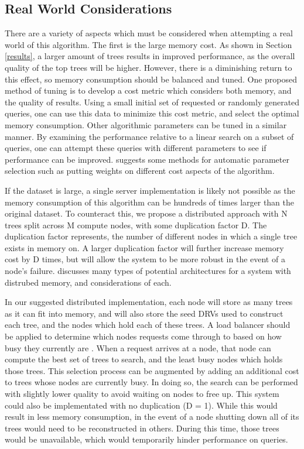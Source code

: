 \subsection{Real World Considerations}
\label{sec:realworld}

There are a variety of aspects which must be considered when attempting a real world of this algorithm.  The first is the large memory cost.  As shown in Section \ref{results}, a larger amount of trees results in improved performance, as the overall quality of the top trees will be higher.  However, there is a diminishing return to this effect, so memory consumption should be balanced and tuned.  One proposed method of tuning is to develop a cost metric which considers both memory, and the quality of results.  Using a small initial set of requested or randomly generated queries, one can use this data to minimize this cost metric, and select the optimal memory consumption.  Other algorithmic parameters can be tuned in a similar manner.  By examining the performance relative to a linear search on a subset of queries, one can attempt these queries with different parameters to see if performance can be improved.  \citep{muja_flann_2009} suggests some methods for automatic parameter selection such as putting weights on different cost aspects of the algorithm.

If the dataset is large, a single server implementation is likely not possible as the memory consumption of this algorithm can be hundreds of times larger than the original dataset.  To counteract this, we propose a distributed approach with N trees split across M compute nodes, with some duplication factor D.  The duplication factor represents, the number of different nodes in which a single tree exists in memory on.  A larger duplication factor will further increase memory cost by D times, but will allow the system to be more robust in the event of a node's failure.  \citep{nitzberg1991distributed} discusses many types of potential architectures for a system with distrubed memory, and considerations of each.

In our suggested distributed implementation, each node will store as many trees as it can fit into memory, and will also store the seed DRVs used to construct each tree, and the nodes which hold each of these trees.  A load balancer should be applied to determine which nodes requests come through to based on how busy they currently are \citep{cybenko1989dynamic}.  When a request arrives at a node, that node can compute the best set of trees to search, and the least busy nodes which holds those trees.  This selection process can be augmented by adding an additional cost to trees whose nodes are currently busy.  In doing so, the search can be performed with slightly lower quality to avoid waiting on nodes to free up.  This system could also be implementated with no duplication (D = 1).  While this would result in less memory consumption, in the event of a node shutting down all of its trees would need to be reconstructed in others.  During this time, those trees would be unavailable, which would temporarily hinder performance on queries.

